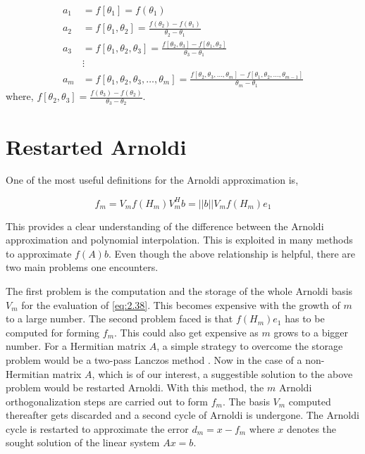 \[
\begin{aligned}
    a_1 &= f[\theta_1] = f(\theta_1) \\
    a_2 &= f[\theta_1, \theta_2] = \frac{f(\theta_2) - f(\theta_1)}{\theta_2 - \theta_1} \\
    a_3 &= f[\theta_1, \theta_2, \theta_3] = \frac{f[\theta_2, \theta_3] - f[\theta_1, \theta_2]}{\theta_3 - \theta_1} \\
    &\vdots \\
    a_m &= f[\theta_1, \theta_2, \theta_3, \ldots, \theta_m] = \frac{f[\theta_2, \theta_3, \ldots, \theta_m] - f[\theta_1, \theta_2, \ldots, \theta_{m-1}]}{\theta_m - \theta_1}
\end{aligned}
\]
where, $f[\theta_2, \theta_3]=\frac{f(\theta_3) - f(\theta_2)}{\theta_3 - \theta_2}$.

\section{Restarted Arnoldi}
\label{sec:restarted_arnoldi}

One of the most useful definitions for the Arnoldi approximation is,

\begin{equation}
    f_{m} = V_{m}f(H_{m})V_m^{H}b = ||b||V_{m}f(H_{m})e_{1}
    \label{eq:2.38}
\end{equation}

This provides a clear understanding of the difference between the Arnoldi approximation and polynomial interpolation. This is exploited in many methods to approximate $f(A)b$. Even though the above relationship is helpful, there are two main problems one encounters. 

The first problem is the computation and the storage of the whole Arnoldi basis $V_{m}$ for the evaluation of \ref{eq:2.38}. This becomes expensive with the growth of $m$ to a large number. The second problem faced is that $f(H_{m})e_{1}$ has to be computed for forming $f_{m}$. This could also get expensive as $m$ grows to a bigger number. For a Hermitian matrix $A$, a simple strategy to overcome the storage problem would be a two-pass Lanczos method \cite{48}. Now in the case of a non-Hermitian matrix $A$, which is of our interest, a suggestible solution to the above problem would be restarted Arnoldi. With this method, the $m$ Arnoldi orthogonalization steps are carried out to form $f_{m}$. The basis $V_{m}$ computed thereafter gets discarded and a second cycle of Arnoldi is undergone. The Arnoldi cycle is restarted to approximate the error $d_{m}=x-f_{m}$ where $x$ denotes the sought solution of the linear system $Ax=b$.

